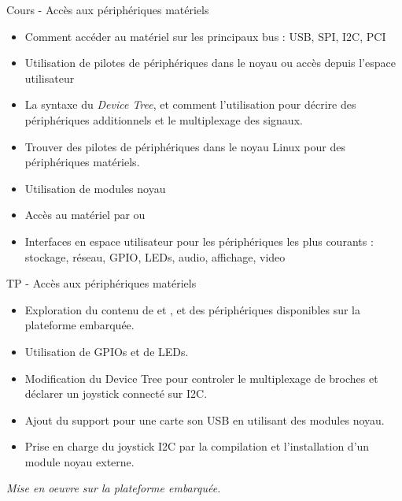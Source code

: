 \documentclass[a4paper,12pt,obeyspaces,spaces,hyphens]{article}
\begin{document}
\feagendatwocolumn
{Cours - Accès aux périphériques matériels}
{
  \begin{itemize}
  \item Comment accéder au matériel sur les principaux bus : USB, SPI,
    I2C, PCI
  \item Utilisation de pilotes de périphériques dans le noyau ou accès
    depuis l'espace utilisateur
  \item La syntaxe du {\em Device Tree}, et comment l'utilisation pour
    décrire des périphériques additionnels et le multiplexage des
    signaux.
  \item Trouver des pilotes de périphériques dans le noyau Linux pour
    des périphériques matériels.
  \item Utilisation de modules noyau
  \item Accès au matériel par  ou 
  \item Interfaces en espace utilisateur pour les périphériques les
    plus courants : stockage, réseau, GPIO, LEDs, audio, affichage,
    video
  \end{itemize}
}
{TP - Accès aux périphériques matériels}
{
  \begin{itemize}
  \item Exploration du contenu de  et , et des
    périphériques disponibles sur la plateforme embarquée.
  \item Utilisation de GPIOs et de LEDs.
  \item Modification du Device Tree pour controler le multiplexage
    de broches et déclarer un joystick connecté sur I2C.
  \item Ajout du support pour une carte son USB en utilisant des
    modules noyau.
  \item Prise en charge du joystick I2C par la compilation et
    l'installation d'un module noyau externe.
  \end{itemize}

  \vspace{0.5cm}
  {\em Mise en oeuvre sur la plateforme embarquée.}
}
\end{document}
